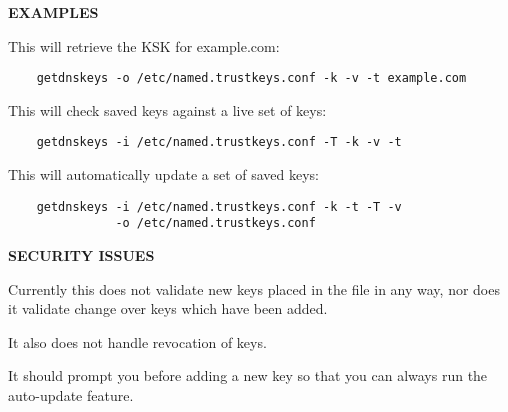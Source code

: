 {\bf EXAMPLES}

This  will retrieve the KSK for example.com:

\begin{verbatim}
    getdnskeys -o /etc/named.trustkeys.conf -k -v -t example.com
\end{verbatim}

This  will check saved keys against a live set of keys:

\begin{verbatim}
    getdnskeys -i /etc/named.trustkeys.conf -T -k -v -t
\end{verbatim}

This  will automatically update a set of saved keys:

\begin{verbatim}
    getdnskeys -i /etc/named.trustkeys.conf -k -t -T -v
               -o /etc/named.trustkeys.conf
\end{verbatim}

{\bf SECURITY ISSUES}

Currently this does not validate new keys placed in the file in any
way, nor does it validate change over keys which have been added.

It also does not handle revocation of keys.

It should prompt you before adding a new key so that you can always
run the auto-update feature.


